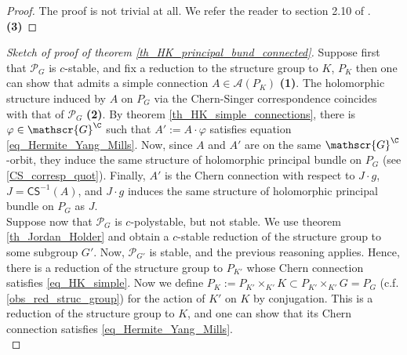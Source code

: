 {
\begin{proof}
    The proof is not trivial at all. We refer the reader to section 2.10 of \parencite{garcia2009hitchin}. \textbf{(3)}
\end{proof}

\begin{proof}[\textit{Sketch of proof of theorem} \ref{th_HK_principal_bund_connected}]
    Suppose first that \(\mathcal{P}_G\) is \(c\)-stable, and fix a reduction to the structure group to \(K\), \(P_K\) then one can show that admits a simple connection \(A \in \mathscr{A}(P_K)\) \textbf{(1)}. The holomorphic structure induced by \(A\) on \(P_G\) via the Chern-Singer correspondence coincides with that of \(\mathcal{P}_G\) \textbf{(2)}. By theorem \ref{th_HK_simple_connections}, there is \(\varphi \in \mathscr{G}^\C\) such that \(A':=A \cdot \varphi\) satisfies equation \ref{eq_Hermite_Yang_Mills}. Now, since \(A\) and \(A'\) are on the same \(\mathscr{G}^\C\)-orbit, they induce the same structure of holomorphic principal bundle on \(P_G\) (see \eqref{CS_corresp_quot}). Finally, \(A'\) is the Chern connection with respect to \(J\cdot g\), \(J=\mathsf{CS}^{-1}(A)\), and \(J\cdot g\) induces the same structure of holomorphic principal bundle on \(P_G\) as \(J\). \\ 
    
    Suppose now that \(\mathcal{P}_G\) is \(c\)-polystable, but not stable. We use theorem \ref{th_Jordan_Holder} and obtain a \(c\)-stable reduction of the structure group to some subgroup \(G'\). Now, \(\mathcal{P}_{G'}\) is stable, and the previous reasoning applies. Hence, there is a reduction of the structure group to \(P_{K'}\) whose Chern connection satisfies \eqref{eq_HK_simple}. Now we define \(P_K:=P_{K'} \times _{K'} K\subset P_{K'} \times_{K'} G=P_G\) (c.f. \ref{obs_red_struc_group}) for the action of \(K'\) on \(K\) by conjugation. This is a reduction of the structure group to \(K\), and one can show that its Chern connection satisfies \eqref{eq_Hermite_Yang_Mills}. \\


\end{proof}}
